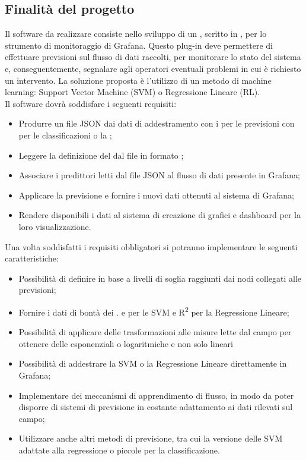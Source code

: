 \documentclass[../studio-di-fattibilita.tex]{subfiles}
\begin{document}
\subsection{Finalità del progetto}%
\label{sub:finalita_del_progetto}
Il software da realizzare consiste nello sviluppo di un , scritto in , per lo strumento di monitoraggio di Grafana. Questo plug-in deve permettere di effettuare previsioni sul flusso di dati raccolti, per monitorare lo stato del sistema e, conseguentemente, segnalare agli operatori eventuali problemi in cui è richiesto un intervento. La soluzione proposta è l'utilizzo di un metodo di machine learning: Support Vector Machine (SVM) o Regressione Lineare (RL).\\
Il software dovrà soddisfare i seguenti requisiti:
\begin{itemize}
  \item Produrre un file JSON dai dati di addestramento con i  per le previsioni con  per le classificazioni o la ;
  \item Leggere la definizione del  dal file in formato ;
  \item Associare i predittori letti dal file JSON al flusso di dati presente in Grafana;
  \item Applicare la previsione e fornire i nuovi dati ottenuti al sistema di Grafana;
  \item Rendere disponibili i dati al sistema di creazione di grafici e dashboard per la loro visualizzazione.
\end{itemize}
Una volta soddisfatti i requisiti obbligatori si potranno implementare le seguenti caratteristiche:
\begin{itemize}
  \item Possibilità di definire  in base a livelli di soglia raggiunti dai nodi collegati alle previsioni;
  \item Fornire i dati di bontà dei .  e  per le SVM e R\textsuperscript{2} per la Regressione Lineare;
  \item Possibilità di applicare delle trasformazioni alle misure lette dal campo per ottenere delle  esponenziali o logaritmiche e non solo lineari
  \item Possibilità di addestrare la SVM o la Regressione Lineare direttamente in Grafana;
  \item Implementare dei meccanismi di apprendimento di flusso, in modo da poter disporre di sistemi di previsione in costante adattamento ai dati rilevati sul campo;
  \item Utilizzare anche altri metodi di previsione, tra cui la versione delle SVM adattate alla regressione o piccole  per la classificazione.
\end{itemize}
\end{document}
